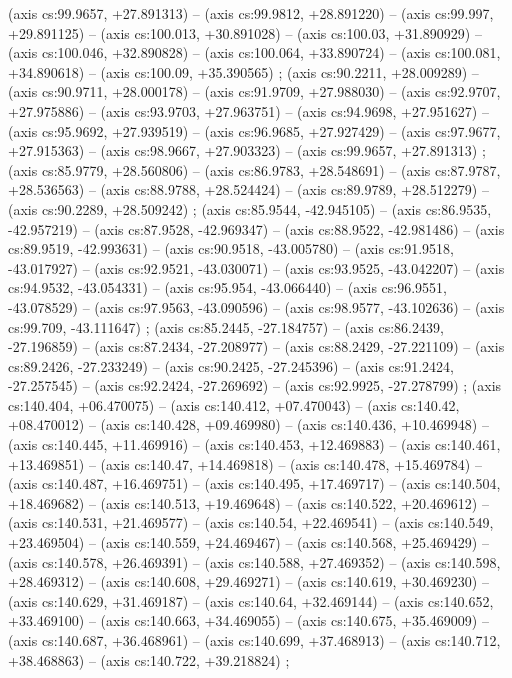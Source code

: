     (axis cs:99.9657,    +27.891313) --  (axis cs:99.9812,    +28.891220) --  (axis cs:99.997,    +29.891125) --  (axis cs:100.013,    +30.891028) --  (axis cs:100.03,    +31.890929) --  (axis cs:100.046,    +32.890828) --  (axis cs:100.064,    +33.890724) --  (axis cs:100.081,    +34.890618) --  (axis cs:100.09,    +35.390565) ;
    (axis cs:90.2211,    +28.009289) --  (axis cs:90.9711,    +28.000178) --  (axis cs:91.9709,    +27.988030) --  (axis cs:92.9707,    +27.975886) --  (axis cs:93.9703,    +27.963751) --  (axis cs:94.9698,    +27.951627) --  (axis cs:95.9692,    +27.939519) --  (axis cs:96.9685,    +27.927429) --  (axis cs:97.9677,    +27.915363) --  (axis cs:98.9667,    +27.903323) --  (axis cs:99.9657,    +27.891313) ;
    (axis cs:85.9779,    +28.560806) --  (axis cs:86.9783,    +28.548691) --  (axis cs:87.9787,    +28.536563) --  (axis cs:88.9788,    +28.524424) --  (axis cs:89.9789,    +28.512279) --  (axis cs:90.2289,    +28.509242) ;
    (axis cs:85.9544,    -42.945105) --  (axis cs:86.9535,    -42.957219) --  (axis cs:87.9528,    -42.969347) --  (axis cs:88.9522,    -42.981486) --  (axis cs:89.9519,    -42.993631) --  (axis cs:90.9518,    -43.005780) --  (axis cs:91.9518,    -43.017927) --  (axis cs:92.9521,    -43.030071) --  (axis cs:93.9525,    -43.042207) --  (axis cs:94.9532,    -43.054331) --  (axis cs:95.954,    -43.066440) --  (axis cs:96.9551,    -43.078529) --  (axis cs:97.9563,    -43.090596) --  (axis cs:98.9577,    -43.102636) --  (axis cs:99.709,    -43.111647) ;
    (axis cs:85.2445,    -27.184757) --  (axis cs:86.2439,    -27.196859) --  (axis cs:87.2434,    -27.208977) --  (axis cs:88.2429,    -27.221109) --  (axis cs:89.2426,    -27.233249) --  (axis cs:90.2425,    -27.245396) --  (axis cs:91.2424,    -27.257545) --  (axis cs:92.2424,    -27.269692) --  (axis cs:92.9925,    -27.278799) ;
    (axis cs:140.404,    +06.470075) --  (axis cs:140.412,    +07.470043) --  (axis cs:140.42,    +08.470012) --  (axis cs:140.428,    +09.469980) --  (axis cs:140.436,    +10.469948) --  (axis cs:140.445,    +11.469916) --  (axis cs:140.453,    +12.469883) --  (axis cs:140.461,    +13.469851) --  (axis cs:140.47,    +14.469818) --  (axis cs:140.478,    +15.469784) --  (axis cs:140.487,    +16.469751) --  (axis cs:140.495,    +17.469717) --  (axis cs:140.504,    +18.469682) --  (axis cs:140.513,    +19.469648) --  (axis cs:140.522,    +20.469612) --  (axis cs:140.531,    +21.469577) --  (axis cs:140.54,    +22.469541) --  (axis cs:140.549,    +23.469504) --  (axis cs:140.559,    +24.469467) --  (axis cs:140.568,    +25.469429) --  (axis cs:140.578,    +26.469391) --  (axis cs:140.588,    +27.469352) --  (axis cs:140.598,    +28.469312) --  (axis cs:140.608,    +29.469271) --  (axis cs:140.619,    +30.469230) --  (axis cs:140.629,    +31.469187) --  (axis cs:140.64,    +32.469144) --  (axis cs:140.652,    +33.469100) --  (axis cs:140.663,    +34.469055) --  (axis cs:140.675,    +35.469009) --  (axis cs:140.687,    +36.468961) --  (axis cs:140.699,    +37.468913) --  (axis cs:140.712,    +38.468863) --  (axis cs:140.722,    +39.218824) ;

